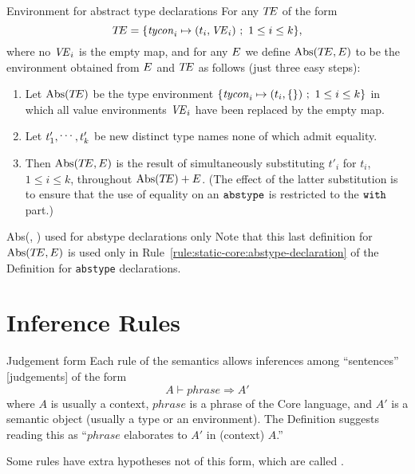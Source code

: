 \begin{definition}{Environment for abstract type declarations}
For any $\mbox{$T\!E$}$ of the form
\begin{equation*}
\mbox{$T\!E$}=\{\textit{tycon\/}_{i}\mapsto(t_{i},\textit{V\kern-.05emE\/}_{i})\ ;\ 1\leq i\leq k\},
\end{equation*}
where no $\textit{V\kern-.05emE\/}_{i}$ is the empty map, and for any $E$ we define
$\mathop{\rm Abs}\nolimits(\mbox{$T\!E$},E)$ to be the environment obtained from 
$E$ and $\mbox{$T\!E$}$ as follows (just three easy steps):
\begin{enumerate}
\item Let $\mathop{\rm Abs}\nolimits(\mbox{$T\!E$})$ be the type environment
$\{\textit{tycon\/}_{i}\mapsto(t_{i},\{\})\ ;\ 1\leq i\leq k\}$
in which all value environments $\textit{V\kern-.05emE\/}_{i}$ have been replaced by the empty map. 
\item Let $t'_{1},\mathinner{{}^{\textstyle .\,.\,.}},t'_{k}$ be new distinct type names none of which
admit equality.
\item Then $\mathop{\rm Abs}\nolimits(\mbox{$T\!E$},E)$ is the result of simultaneously
substituting
$t'_{i}$ for $t_{i}$, $1\leq i\leq k$,  throughout $\mathop{\rm Abs}\nolimits(\mbox{$T\!E$})+E$. 
(The effect of the latter substitution is to ensure that the use of 
equality on  an ${\tt abstype}$ is restricted to the ${\tt with}$ part.)
\end{enumerate}
\end{definition}

\begin{remark}{Abs(\TE, \E) used for abstype declarations only}
Note that this last definition for $\mathop{\rm Abs}\nolimits(\mbox{$T\!E$},E)$ is used only in
Rule~\eqref{rule:static-core:abstype-declaration} of the Definition for \texttt{abstype} declarations.
\end{remark}

\section{Inference Rules}\label{section:static-core:inference-rules}

\begin{clause}{Judgement form}
Each rule of the semantics allows inferences among ``sentences''
[judgements] of the form
\begin{equation*}
A\vdash phrase\Rightarrow A'
\end{equation*}
where $A$ is usually a context, $phrase$ is a phrase of the Core
language, and $A'$ is a semantic object (usually a type or an
environment). The Definition suggests reading this as ``$phrase$
elaborates to $A'$ in (context) $A$.''

Some rules have extra hypotheses not of this form, which are called
.
\end{clause}

